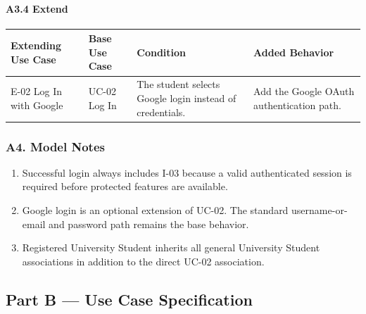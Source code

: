 \documentclass[12pt]{article}
\renewcommand{\baselinestretch}{1.5}
\begin{document}
\hypertarget{sec:a3-4-extend}{}
\paragraph*{A3.4 Extend}
\par\medskip

\begingroup
\small
\renewcommand{\baselinestretch}{1.0}\selectfont
\renewcommand{\arraystretch}{1.15}
\setlength{\tabcolsep}{6pt}
\begin{longtable}{|>{\raggedright\arraybackslash}p{}|>{\raggedright\arraybackslash}p{}|>{\raggedright\arraybackslash}p{}|>{\raggedright\arraybackslash}p{}|}
\hline
\textbf{Extending Use Case} & \textbf{Base Use Case} & \textbf{Condition} & \textbf{Added Behavior} \\ \hline
\endhead
E-02 Log In with Google & UC-02 Log In & The student selects Google login instead of credentials. & Add the Google OAuth authentication path. \\ \hline
\end{longtable}
\endgroup
\par\medskip

\hypertarget{sec:a4-model-notes}{}
\subsubsection*{A4. Model Notes}
\par\medskip

\begin{enumerate}
\item Successful login always includes I-03 because a valid authenticated session is required before protected features are available.
\item Google login is an optional extension of UC-02. The standard username-or-email and password path remains the base behavior.
\item Registered University Student inherits all general University Student associations in addition to the direct UC-02 association.
\end{enumerate}
\par\medskip

\hypertarget{sec:part-b-use-case-specification}{}
\subsection*{Part B --- Use Case Specification}
\par\medskip
\end{document}
